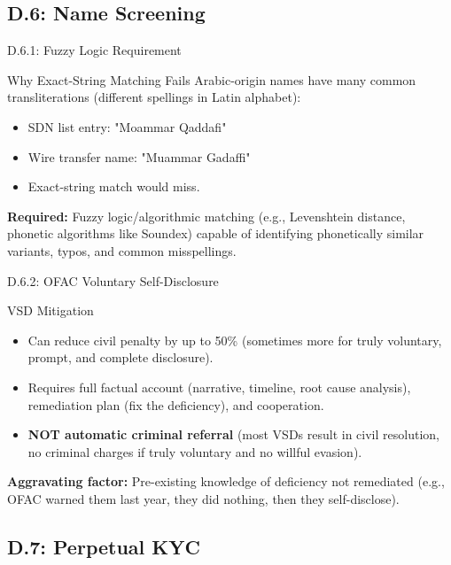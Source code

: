 \documentclass{beamer}
\begin{document}
	\subsection{D.6: Name Screening}
	
	\begin{frame}{D.6.1: Fuzzy Logic Requirement}
		\begin{block}{Why Exact-String Matching Fails}
			Arabic-origin names have many common transliterations (different spellings in Latin alphabet):
			\begin{itemize}
				\item SDN list entry: "Moammar Qaddafi"
				\item Wire transfer name: "Muammar Gadaffi"
				\item Exact-string match would miss.
			\end{itemize}
		\end{block}
		\textbf{Required:} Fuzzy logic/algorithmic matching (e.g., Levenshtein distance, phonetic algorithms like Soundex) capable of identifying phonetically similar variants, typos, and common misspellings.
	\end{frame}
	
	\begin{frame}{D.6.2: OFAC Voluntary Self-Disclosure}
		\begin{block}{VSD Mitigation}
			\begin{itemize}
				\item Can reduce civil penalty by up to 50\% (sometimes more for truly voluntary, prompt, and complete disclosure).
				\item Requires full factual account (narrative, timeline, root cause analysis), remediation plan (fix the deficiency), and cooperation.
				\item \textbf{NOT automatic criminal referral} (most VSDs result in civil resolution, no criminal charges if truly voluntary and no willful evasion).
			\end{itemize}
		\end{block}
		\textbf{Aggravating factor:} Pre-existing knowledge of deficiency not remediated (e.g., OFAC warned them last year, they did nothing, then they self-disclose).
	\end{frame}
	
	\subsection{D.7: Perpetual KYC}
	
\end{document}
